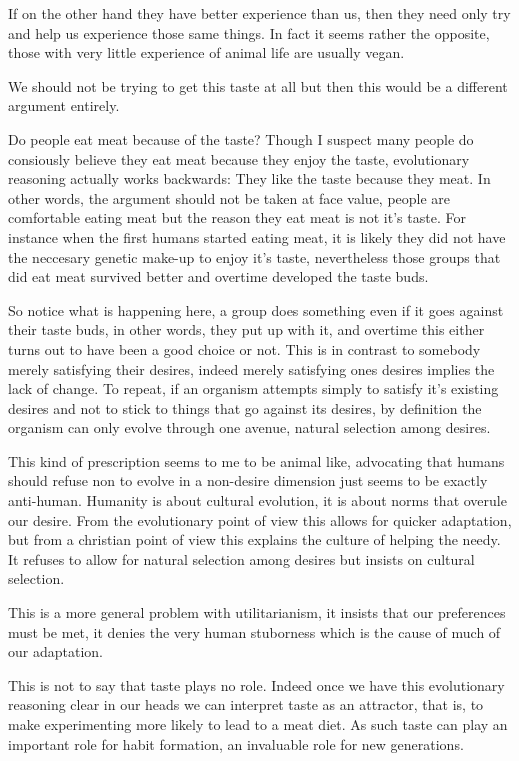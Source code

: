 If on the other hand they have better experience than us, then they need only try and help us experience those same things. In fact it seems rather the opposite, those with very little experience of animal life are usually vegan. 

We should not be trying to get this taste at all but then this would be a different argument entirely. 




Do people eat meat because of the taste? Though I suspect many people do consiously believe they eat meat because they enjoy the taste, evolutionary reasoning actually works backwards: They like the taste because they meat. In other words, the argument should not be taken at face value, people are comfortable eating meat but the reason they eat meat is not it's taste. For instance when the first humans started eating meat, it is likely they did not have the neccesary genetic make-up to enjoy it's taste, nevertheless those groups that did eat meat survived better and overtime developed the taste buds. 

So notice what is happening here, a group does something even if it goes against their taste buds, in other words, they put up with it, and overtime this either turns out to have been a good choice or not. This is in contrast to somebody merely satisfying their desires, indeed merely satisfying ones desires implies the lack of change. To repeat, if an organism attempts simply to satisfy it's existing desires and not to stick to things that go against its desires, by definition the organism can only evolve through one avenue, natural selection among desires. 

This kind of prescription seems to me to be animal like, advocating that humans should refuse non to evolve in a non-desire dimension just seems to be exactly anti-human. Humanity is about cultural evolution, it is about norms that overule our desire. From the evolutionary point of view this allows for quicker adaptation, but from a christian point of view this explains the culture of helping the needy. It refuses to allow for natural selection among desires but insists on cultural selection. 

This is a more general problem with utilitarianism, it insists that our preferences must be met, it denies the very human stuborness which is the cause of much of our adaptation. 

This is not to say that taste plays no role. Indeed once we have this evolutionary reasoning clear in our heads we can interpret taste as an attractor, that is, to make experimenting more likely to lead to a meat diet. As such taste can play an important role for habit formation, an invaluable role for new generations.

